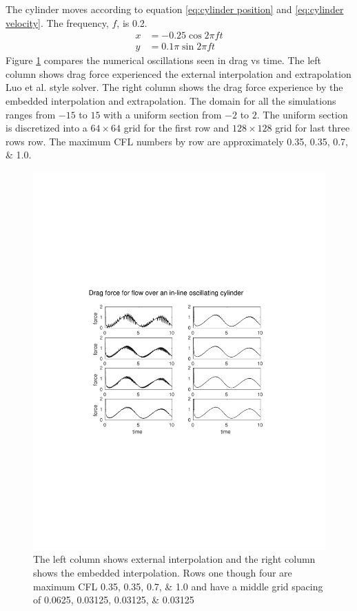 \documentclass[onehalf,11pt]{beavtex}
\begin{document}
The cylinder moves according to equation \eqref{eq:cylinder position} and \eqref{eq:cylinder velocity}.
The frequency, $f$, is 0.2.
\begin{align}
x&=-0.25\cos{2\pi ft}\label{eq:cylinder position}\\
y&=0.1\pi\sin{2\pi ft}\;\label{eq:cylinder velocity}
\end{align}
Figure \ref{fig:osccylinder} compares the numerical oscillations seen in drag vs time. 
The left column shows drag force experienced the external interpolation and extrapolation Luo et al. style solver.
The right column shows the drag force experience by the embedded interpolation and extrapolation.
The domain for all the simulations ranges from $-15$ to $15$ with a uniform section from $-2$ to $2$.
The uniform section is discretized into a $64 \times 64$ grid for the first row and $ 128 \times 128$ grid for last three rows row.
The maximum CFL numbers by row are approximately \numlist{0.35; 0.35; 0.7; 1.0}.
\begin{figure}[h]
	\centering
	\includegraphics[width=\textwidth]{cropped_oscflow}
	\caption{The left column shows external interpolation and the right column shows the embedded interpolation. Rows one though four are maximum CFL \numlist{0.35; 0.35; 0.7; 1.0} and have a middle grid spacing of \numlist{0.0625; 0.03125; 0.03125; 0.03125}}
	\label{fig:osccylinder}
\end{figure}
\end{document}
